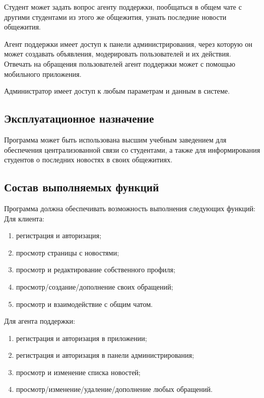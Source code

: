 \documentclass{../includes/TechDoc}
\begin{document}
    Студент может задать вопрос агенту поддержки, пообщаться в общем чате с другими
    студентами из этого же общежития, узнать последние новости общежития.

    Агент поддержки имеет доступ к панели администрирования, через которую он может создавать объявления, модерировать пользователей и их действия.
    Отвечать на обращения пользователей агент поддержки может с помощью мобильного приложения.

    Администратор имеет доступ к любым параметрам и данным в системе.

    \subsection{Эксплуатационное назначение}

    Программа может быть использована высшим учебным заведением для обеспечения централизованной связи со студентами, а
    также для информирования студентов о последних новостях в своих общежитиях.

    \subsection{Состав выполняемых функций}

    Программа должна обеспечивать возможность выполнения следующих функций:\\

    Для клиента:
    \begin{enumerate}[noitemsep]
        \item регистрация и авторизация;
        \item просмотр страницы с новостями;
        \item просмотр и редактирование собственного профиля;
        \item просмотр/создание/дополнение своих обращений;
        \item просмотр и взаимодействие с общим чатом.
    \end{enumerate}

    Для агента поддержки:
    \begin{enumerate}[noitemsep]
        \item регистрация и авторизация в приложении;
        \item регистрация и авторизация в панели администрирования;
        \item просмотр и изменение списка новостей;
        \item просмотр/изменение/удаление/дополнение любых обращений.
    \end{enumerate}
\end{document}
